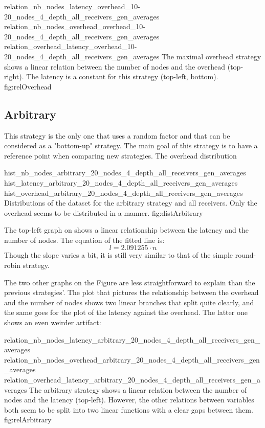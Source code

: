\triplefigure
    {relation_nb_nodes_latency_overhead_10-20_nodes_4_depth_all_receivers_gen_averages}
    {relation_nb_nodes_overhead_overhead_10-20_nodes_4_depth_all_receivers_gen_averages}
    {relation_overhead_latency_overhead_10-20_nodes_4_depth_all_receivers_gen_averages}
    {The maximal overhead  strategy shows a linear relation between the number of
    nodes and the overhead (top-right). The latency is a constant for this
    strategy (top-left, bottom).}
    {fig:relOverhead}

\FloatBarrier
\subsection{Arbitrary}
\label{ssec:arbitrary}

This strategy is the only one that uses a random factor and that can be
considered as a "bottom-up" strategy. The main goal of this strategy is to
have a reference point when comparing new strategies.
The overhead distribution 

\triplefigure
    {hist_nb_nodes_arbitrary_20_nodes_4_depth_all_receivers_gen_averages}
    {hist_latency_arbitrary_20_nodes_4_depth_all_receivers_gen_averages}
    {hist_overhead_arbitrary_20_nodes_4_depth_all_receivers_gen_averages}
    {Distributions of the dataset for the arbitrary strategy and all
    receivers. Only the overhead seems to be distributed in a  manner. }
    {fig:distArbitrary}

The top-left graph on  shows a linear relationship
between the latency and the number of nodes. The equation of the fitted line is:
\[l = 2.091255 \cdot n\]
Though the slope varies a bit, it is still very similar to that of the simple
round-robin strategy.

The two other graphs on the Figure are less straightforward to explain than the
previous strategies'. The plot that pictures the relationship between the
overhead and the number of nodes shows two linear branches that split quite
clearly, and the same goes for the plot of the latency against the overhead.
The latter one shows an even weirder artifact: 

\triplefigure
    {relation_nb_nodes_latency_arbitrary_20_nodes_4_depth_all_receivers_gen_averages}
    {relation_nb_nodes_overhead_arbitrary_20_nodes_4_depth_all_receivers_gen_averages}
    {relation_overhead_latency_arbitrary_20_nodes_4_depth_all_receivers_gen_averages}
    {The arbitrary strategy shows a linear relation between the number of
    nodes and the latency (top-left). However, the other relations between
    variables both seem to be split into two linear functions with a clear gaps
    between them.}
    {fig:relArbitrary}


